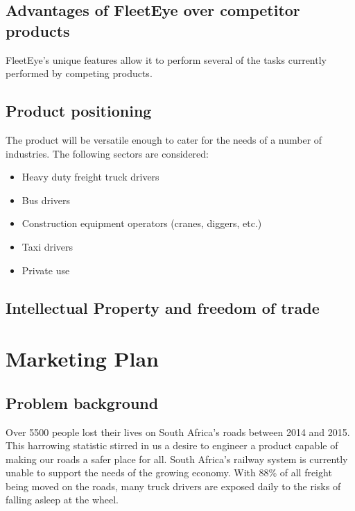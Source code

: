 
\section{Advantages of FleetEye over competitor products} 
FleetEye’s unique features allow it to perform several of the tasks currently performed by competing products.

\section{Product positioning}
The product will be versatile enough to cater for the needs of a number of industries. The following sectors are considered:
\begin{itemize}
\item Heavy duty freight truck drivers
\item Bus drivers
\item Construction equipment operators (cranes, diggers, etc.)
\item Taxi drivers
\item Private use
\end{itemize}

\section{Intellectual Property and freedom of trade}


\newpage
\chapter{Marketing Plan}
\section{Problem background}
Over 5500 people lost their lives on South Africa’s roads between 2014 and 2015. This harrowing statistic stirred in us a desire to engineer a product capable of making our roads a safer place for all. 
South Africa’s railway system is currently unable to support the needs of the growing economy. With 88\% of all freight being moved on the roads, many truck drivers are exposed daily to the risks of falling asleep at the wheel.

